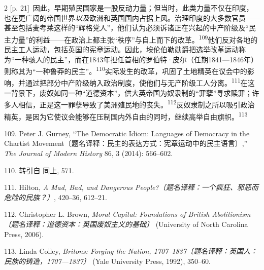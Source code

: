 \documentclass[10pt,a4paper]{article}
\begin{document}
\begin{paracol}{2}
{\scriptsize\color{gray} [p. 21]}\ 因此，早期殖民国家是一股反动力量；但当时，此类力量不仅在印度，也在更广阔的帝国世界\textit{以及}欧洲和英国国内占据上风。治理印度的大多数官员——甚至包括麦考莱这样的“辉格党人”，他们认为必须诉诸正在兴起的中产阶级及“民主力量”的利益——在政治上都主张“秩序”与自上而下的改\mbox{革。\textsuperscript{109}}他们反对各地的民主工人运动，包括英国的宪章运动。因此，埃伦伯勒勋爵把选举改革运动称为“一种骇人的民主”，而在1843年担任首相的罗伯特·皮尔（任期1841—1846年）则称其为“一种鲁莽的民主”。\nobreak\textsuperscript{110}实际发生的改革，巩固了土地精英在议会中的影响，并通过把部分中产阶级纳入政治制度，使他们与无产阶级工人分\mbox{离。\textsuperscript{111}}在这一背景下，废奴如同一种“道德资本”，供大英帝国为奴隶制的“罪孽”寻求赎罪；许多人相信，正是这一罪孽导致了美洲殖民地的丧\mbox{失。\textsuperscript{112}}反奴隶制之所以吸引政治精英，是因为它使议会能够在压制国内外自由的同时，继续高举自由旗\mbox{帜。\textsuperscript{113}}\par{\small 109. Peter J. Gurney, “The Democratic Idiom: Languages of Democracy in the Chartist Movement〔题名译释：民主的表达方式：宪章运动中的民主语言〕,” \textit{The Journal of Modern History} 86, 3 (2014): 566–602.\par}{\small 110. 转引自 同上, 571.\par}{\small 111. Hilton, \textit{A Mad, Bad, and Dangerous People?〔题名译释：一个疯狂、邪恶而危险的民族？〕}, 420–36, 612–21.\par}{\small 112. Christopher L. Brown, \textit{Moral Capital: Foundations of British Abolitionism〔题名译释：道德资本：英国废奴主义的基础〕} (University of North Carolina Press, 2006).\par}{\small 113. Linda Colley, \textit{Britons: Forging the Nation, 1707–1837〔题名译释：英国人：民族的铸造，1707—1837〕} (Yale University Press, 1992), 350–60.\par}
\switchcolumn

\end{paracol}
\end{document}
